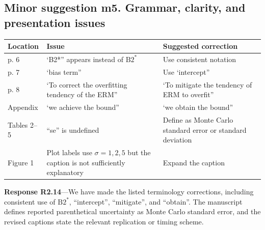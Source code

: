 \documentclass[11pt]{article}
\newcommand{\response}[1]{\par\noindent\textbf{Response #1}---}
\begin{document}
\subsection*{Minor suggestion m5. Grammar, clarity, and presentation issues}
\begin{center}
\begin{tabular}{p{}p{}p{}}
Location & Issue & Suggested correction\\
\hline
p. 6 & ‘B2*” appears instead of $\mathrm{B2}^*$ & Use consistent notation\\
p. 7 & ‘bias term” & Use ‘intercept”\\
p. 8 & ‘To correct the overfitting tendency of the ERM” & ‘To mitigate the tendency of ERM to overfit”\\
Appendix & ‘we achieve the bound” & ‘we obtain the bound”\\
Tables 2--5 & “se” is undefined & Define as Monte Carlo standard error or standard deviation\\
Figure 1 & Plot labels use $\sigma=1,2,5$ but the caption is not sufficiently explanatory & Expand the caption
\end{tabular}
\end{center}

\response{R2.14}We have made the listed terminology corrections, including consistent use of $\mathrm{B2}^*$, ``intercept'', ``mitigate'', and ``obtain''. The manuscript defines reported parenthetical uncertainty as Monte Carlo standard error, and the revised captions state the relevant replication or timing scheme.
\end{document}
